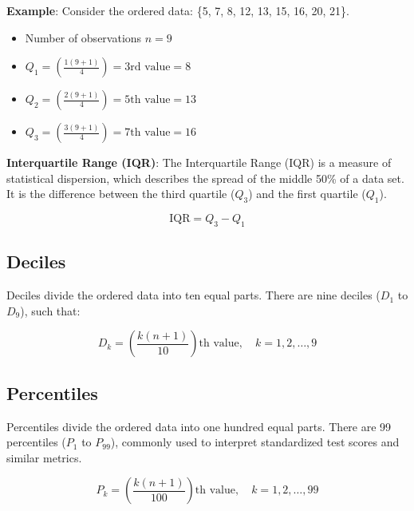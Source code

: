 \documentclass[twoside]{book}
\begin{document}
\textbf{Example}: Consider the ordered data: \{5, 7, 8, 12, 13, 15, 16, 20, 21\}.

\begin{itemize}
    \item Number of observations $ n = 9$
    \item $Q_1 = \left( \frac{1(9+1)}{4} \right) = \text{3rd value} = 8$
    \item $Q_2 = \left( \frac{2(9+1)}{4} \right) = \text{5th value} = 13$
    \item $Q_3 = \left( \frac{3(9+1)}{4} \right) = \text{7th value} = 16$
\end{itemize}

\textbf{Interquartile Range (IQR)}: The {Interquartile Range (IQR)} is a measure of statistical dispersion, which describes the spread of the middle 50\% of a data set. It is the difference between the third quartile (\(Q_3\)) and the first quartile (\(Q_1\)).

\begin{textbox}
    \[
    \text{IQR} = Q_3 - Q_1
    \]
\end{textbox}

\subsection{Deciles}

Deciles divide the ordered data into ten equal parts. There are nine deciles ($D_1$ to $D_9$), such that:

\begin{textbox}
\[
D_k = \left( \frac{k(n+1)}{10} \right)\text{th value}, \quad k = 1, 2, \dots, 9
\]
\end{textbox}


\subsection{Percentiles}

Percentiles divide the ordered data into one hundred equal parts. There are 99 percentiles ($P_1$ to $P_{99}$), commonly used to interpret standardized test scores and similar metrics.

\begin{textbox}
\[
P_k = \left( \frac{k(n+1)}{100} \right)\text{th value}, \quad k = 1, 2, \dots, 99
\]
\end{textbox}
\end{document}
